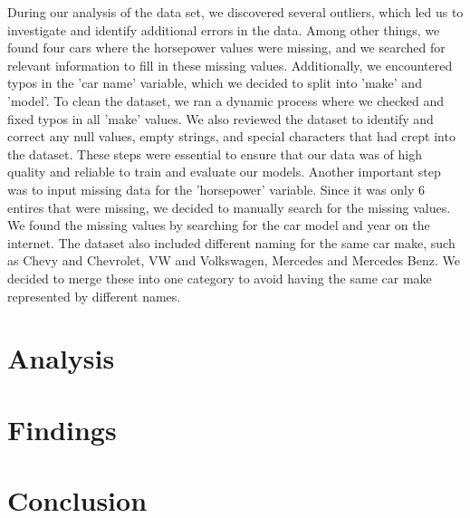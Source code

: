 \documentclass[a4paper, twocolumn]{article}
\begin{document}
During our analysis of the data set, we discovered several outliers, which led us to investigate and identify additional errors in the data. Among other things, we found four cars where the horsepower values were missing, and we searched for relevant information to fill in these missing values. Additionally, we encountered typos in the 'car name' variable, which we decided to split into 'make' and 'model'. To clean the dataset, we ran a dynamic process where we checked and fixed typos in all 'make' values. We also reviewed the dataset to identify and correct any null values, empty strings, and special characters that had crept into the dataset. These steps were essential to ensure that our data was of high quality and reliable to train and evaluate our models. Another important step was to input missing data for the 'horsepower' variable. Since it was only 6 entires that were missing, we decided to manually search for the missing values. We found the missing values by searching for the car model and year on the internet. The dataset also included different naming for the same car make, such as Chevy and Chevrolet, VW and Volkswagen, Mercedes and Mercedes Benz. We decided to merge these into one category to avoid having the same car make represented by different names. 


\section{Analysis\label{sec:Analysis}}


\section{Findings\label{sec:Findings}}


\section{Conclusion\label{sec:Conclusion}}


\printbibliography
\end{document}

